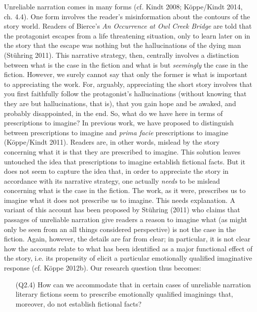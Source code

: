 Unreliable narration comes in many forms (cf. Kindt 2008; K\"oppe/Kindt 2014, ch. 4.4). One form involves the reader's misinformation about the contours of the story world. Readers of Bierce's \emph{An Occurrence at Owl Creek Bridge} are told that the protagonist escapes from a life threatening situation, only to learn later on in the story that the escape was nothing but the hallucinations of the dying man (St\"uhring 2011). This narrative strategy, then, centrally involves a distinction between what is the case in the fiction and what is but \emph{seemingly} the case in the fiction. However, we surely cannot say that only the former is what is important to appreciating the work. For, arguably, appreciating the short story involves that you first faithfully follow the protagonist's hallucinations (without knowing that they are but hallucinations, that is), that you gain hope and be awaked, and probably disappointed, in the end. So, what do we have here in terms of prescriptions to imagine? In previous work, we have proposed to distinguish between prescriptions to imagine and \emph{prima facie} prescriptions to imagine (K\"oppe/Kindt 2011). Readers are, in other words, mislead by the story concerning what it is that they are prescribed to imagine. This solution leaves untouched the idea that prescriptions to imagine establish fictional facts. But it does not seem to capture the idea that, in order to appreciate the story in accordance with its narrative strategy, one actually \emph{needs} to be mislead concerning what is the case in the fiction. The work, as it were, prescribes us to imagine what it does not prescribe us to imagine. This needs explanation. A variant of this account has been proposed by St\"uhring (2011) who claims that passages of unreliable narration give readers a reason to imagine what (as might only be seen from an all things considered perspective) is not the case in the fiction. Again, however, the details are far from clear; in particular, it is not clear how the accounts relate to what has been identified as a major functional effect of the story, i.e. its propensity of elicit a particular emotionally qualified imaginative response (cf. K\"oppe 2012b). Our research question thus becomes:

\vspace{-.1cm}
\begin{itemize}[leftmargin=2cm]
\item[(Q2.4)] How can we accommodate that in certain cases of unreliable narration literary fictions seem  to prescribe emotionally qualified imaginings that, moreover, do not establish fictional facts?
\end{itemize}
\vspace{-.1cm}

